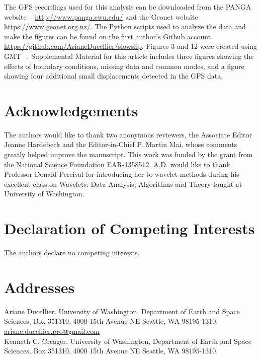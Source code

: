 \documentclass{article}
\begin{document}
The GPS recordings used for this analysis can be downloaded from the PANGA website ~\citep{PANGA} \url{http://www.panga.cwu.edu/} and the Geonet website \url{https://www.geonet.org.nz/}. The Python scripts used to analyze the data and make the figures can be found on the first author's Github account \url{https://github.com/ArianeDucellier/slowslip}. Figures 3 and 12 were created using GMT ~\citep{WES_1991}. Supplemental Material for this article includes three figures showing the effects of boundary conditions, missing data and common modes, and a figure showing four additional small displacements detected in the GPS data.

\section*{Acknowledgements}

The authors would like to thank two anonymous reviewers, the Associate Editor Jeanne Hardebeck and the Editor-in-Chief P. Martin Mai, whose comments greatly helped improve the manuscript. This work was funded by the grant from the National Science Foundation EAR-1358512. A.D. would like to thank Professor Donald Percival for introducing her to wavelet methods during his excellent class on Wavelets: Data Analysis, Algorithms and Theory taught at University of Washington.   

\section*{Declaration of Competing Interests}

The authors declare no competing interests.




\newpage

\section*{Addresses}

Ariane Ducellier. University of Washington, Department of Earth and Space Sciences, Box 351310, 4000 15th Avenue NE Seattle, WA 98195-1310. \href{mailto:ariane.ducellier.pro@gmail.com}{ariane.ducellier.pro@gmail.com}\\

Kenneth C. Creager. University of Washington, Department of Earth and Space Sciences, Box 351310, 4000 15th Avenue NE Seattle, WA 98195-1310. \\
\end{document}
